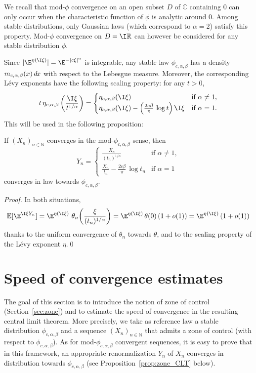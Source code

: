 \documentclass[envcountsame]{svmult}
\newcommand{\N}{\mathbb{N}}
\newcommand{\R}{\mathbb{R}}
\newcommand{\C}{\mathbb{C}}
\newcommand{\esper}{\mathbb{E}}
\newcommand{\DD}[1]{\,d\hspace*{-0.3mm}{#1}}
\begin{document}
We recall that mod-$\phi$ convergence on an open subset $D$ of $\C$ containing $0$
can only occur when the characteristic function of $\phi$
is analytic around $0$.
Among stable distributions, only Gaussian laws (which correspond to $\alpha=2$) satisfy this property.
Mod-$\phi$ convergence on $D=\I \R$ can however be considered for any stable distribution $\phi$.\bigskip

Since $|\E^{\eta(\I\xi)}|=\E^{-|c\xi|^\alpha}$ is integrable, any stable law $\phi_{c,\alpha,\beta}$ has a density $m_{c,\alpha,\beta}(x)\DD{x}$ with respect to the Lebesgue measure. 
Moreover, the corresponding L\'evy exponents have the following scaling property: for any $t>0$,
$$t \,\eta_{c,\alpha,\beta}\left(\frac{\I\xi}{t^{1/\alpha}}\right)=
\begin{cases}
\eta_{c,\alpha,\beta}(\I\xi)&\text{if }\alpha \neq 1,\\
\eta_{c,\alpha,\beta}(\I\xi) - \left(\frac{2c\beta}{\pi}\,\log t\right)\I\xi &\text{if }\alpha=1.
\end{cases}
$$
This will be used in the following proposition:
\begin{proposition}\label{prop:clt}
If $(X_n)_{n \in \N}$ converges in the mod-$\phi_{c,\alpha,\beta}$ sense, then
$$Y_n=\begin{cases}
\frac{X_n}{(t_n)^{1/\alpha}}&\text{if }\alpha \neq 1,\\
\frac{X_n}{t_n}-\frac{2c\beta}{\pi} \,\log t_n&\text{if }\alpha=1
\end{cases}$$
converges in law towards $\phi_{c,\alpha,\beta}$.
\end{proposition}

\begin{proof}
In both situations,
$$\esper[\E^{\I \xi Y_n}] = \E^{\eta(\I\xi)}\,\,\theta_n\!\left(\frac{\xi}{(t_n)^{1/\alpha}}\right)=\E^{\eta(\I\xi)}\,\theta(0)\,(1+o(1)) = \E^{\eta(\I\xi)}\,(1+o(1))$$
thanks to the uniform convergence of $\theta_n$ towards $\theta$, and to the scaling property of the L\'evy exponent $\eta$.\qed
\end{proof} 






\section{Speed of convergence estimates}\label{sec:testfunctions}

The goal of this section is to introduce the notion of zone of control (Section~\ref{sec:zone})
and to estimate the speed of convergence in the resulting central limit theorem.
More precisely, we take as reference law a stable distribution $\phi_{c,\alpha,\beta}$
and a sequence $(X_n)_{n \in \N}$ that admits a zone of control (with respect to $\phi_{c,\alpha,\beta}$).
As for mod-$\phi_{c,\alpha,\beta}$ convergent sequences, it is easy to prove
that in this framework, an appropriate renormalization $Y_n$ of $X_n$ converges in distribution
towards $\phi_{c,\alpha,\beta}$ (see Proposition~\ref{prop:zone_CLT} below).\medskip
\end{document}
